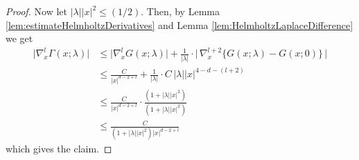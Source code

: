 \begin{proof}
    Now let $|\lambda| |x|^2 \leq ({1}/{2})$.
    Then, by Lemma \ref{lem:estimateHelmholtzDerivatives} and Lemma \ref{lem:HelmholtzLaplaceDifference} we get
    \begin{align*}
      \big|\nabla_x^l \Gamma(x; \lambda) \big|
      &\leq \big|\nabla_x^l G(x; \lambda) \big| 
      + \frac{1}{|\lambda|} \cdot \Big|\,\nabla_x^{l + 2} \Big\{ G(x; \lambda) - G(x; 0) \Big\}\,\Big| \\
      &\leq \frac{C}{|x|^{d - 2 + l}} + \frac{1}{|\lambda|} \cdot C\, |\lambda| |x|^{4 - d - (l + 2)} \\
      &\leq \frac{C}{|x|^{d - 2 + l}}\cdot  \frac{(1 + |\lambda| |x|^2)}{(1 + |\lambda| |x|^2)} \\
      &\leq \frac{C}{(1 + |\lambda| |x|^2) |x|^{d - 2 + l}}
    \end{align*}
    which gives the claim.
  \end{proof}



